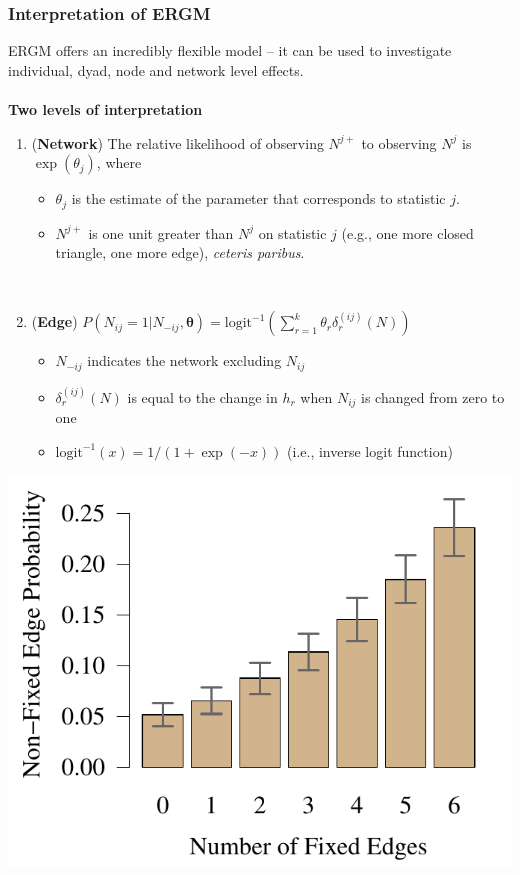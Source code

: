 \documentclass[handout]{beamer}
\newcommand{\p}{\pause}
\begin{document}
\begin{frame} \frametitle{Interpretation of ERGM}
ERGM offers an incredibly flexible model -- it can be used to investigate individual, dyad, node and network level effects.
\\~\\ \p 
{\bf Two levels of interpretation}
\begin{enumerate}
\item ({\bf Network})  The relative likelihood of observing $N^{j+}$ to observing $N^{j}$ is $\exp(\theta_j)$, where
\begin{itemize}
\item $\theta_j$ is the estimate of the parameter that corresponds to statistic $j$.
\item $N^{j+}$ is one unit greater than $N^{j}$ on statistic $j$ (e.g.,  one more closed triangle, one more edge), {\em ceteris paribus}.
\end{itemize} ~\\
\item  ({\bf Edge}) $P(N_{ij} = 1|N_{-ij}, \bm{\theta}) = \text{logit}^{-1}\left(\sum_{r=1}^k \theta_r\delta_{r}^{(ij)}(N) \right)$
\begin{itemize}
\item $N_{-ij}$ indicates the network excluding $N_{ij}$
\item  $\delta_{r}^{(ij)}(N)$ is equal to the change in $h_r$ when $N_{ij}$ is changed from zero to one
\item  $\text{logit}^{-1}(x) = 1/(1+\exp(-x))$ (i.e., inverse logit function)
\end{itemize}
\end{enumerate}
\end{frame}


\begin{frame}
\begin{center}
\includegraphics[scale=.85]{node_int.pdf}
\end{center}
\end{frame}
\end{document}

